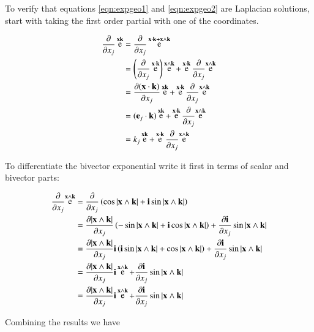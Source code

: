 \documentclass{article}      %
\newcommand{\dxj}[2] {\frac {\partial {#1}} {\partial {x_{#2}}}}
\DeclareMathOperator{\Exp}{e}
\begin{document}
To verify that equations \ref{eqn:expgeo1} and \ref{eqn:expgeo2} are Laplacian solutions, start with taking the first order partial with one
of the coordinates.

\begin{align*}
\dxj{}{j}\Exp^{\Bx\Bk}
&= \dxj{}{j}\Exp^{\Bx \cdot \Bk + \Bx \wedge \Bk} \\
&= \left(\dxj{}{j}\Exp^{\Bx \cdot \Bk}\right) \Exp^{\Bx \wedge \Bk} + \Exp^{\Bx \cdot \Bk}\dxj{}{j}{\Exp^{\Bx \wedge \Bk}} \\
&= \dxj{(\Bx \cdot \Bk)}{j}\Exp^{\Bx\Bk} + \Exp^{\Bx \cdot \Bk}\dxj{}{j}{\Exp^{\Bx \wedge \Bk}} \\
&= (\Be_j \cdot \Bk)\Exp^{\Bx\Bk} + \Exp^{\Bx \cdot \Bk}\dxj{}{j}{\Exp^{\Bx \wedge \Bk}} \\
&= k_j\Exp^{\Bx\Bk} + \Exp^{\Bx \cdot \Bk}\dxj{}{j}{\Exp^{\Bx \wedge \Bk}} \\
\end{align*}

To differentiate the bivector exponential write it first in terms of scalar and bivector parts:

\begin{align*}
\dxj{}{j}{\Exp^{\Bx \wedge \Bk}}
&= \dxj{}{j} \left( \cos{\abs{\Bx \wedge \Bk}} + \Bi \sin{\abs{\Bx \wedge \Bk} } \right) \\
&= \dxj{\abs{\Bx \wedge \Bk}}{j}
      \left(-\sin{\abs{\Bx \wedge \Bk}} + \Bi \cos{\abs{\Bx \wedge \Bk} } \right)
 + \dxj{\Bi}{j} \sin{\abs{\Bx \wedge \Bk}} \\
&=
\dxj{\abs{\Bx \wedge \Bk}}{j}
\Bi \left(\Bi\sin{\abs{\Bx \wedge \Bk}} + \cos{\abs{\Bx \wedge \Bk}} \right)
 + \dxj{\Bi}{j} \sin{\abs{\Bx \wedge \Bk}} \\
&=
\dxj{\abs{\Bx \wedge \Bk}}{j}
\Bi
\Exp^{\Bx \wedge \Bk}
 + \dxj{\Bi}{j} \sin{\abs{\Bx \wedge \Bk}} \\
&= 
\dxj{\abs{\Bx \wedge \Bk}}{j}\Bi \Exp^{\Bx \wedge \Bk} 
 + \dxj{\Bi}{j} \sin{\abs{\Bx \wedge \Bk}} \\
\end{align*}

Combining the results we have
\end{document}
